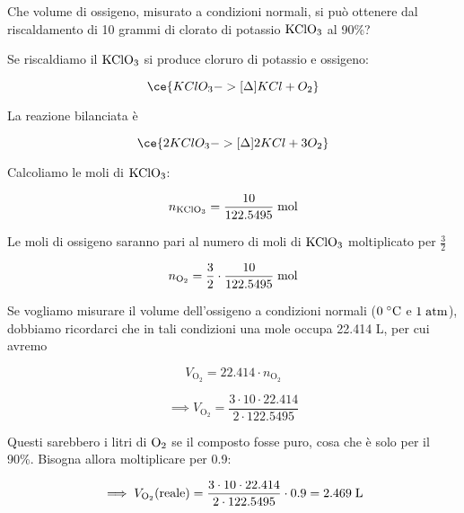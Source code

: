 \begin{esercizio}[$\bigstar$]
    Che volume di ossigeno, misurato a condizioni normali, si può ottenere dal riscaldamento di 10 grammi di clorato di potassio $\rm KClO_3$ al 90\%?
\end{esercizio}
\begin{soluzione}
    Se riscaldiamo il $\rm KClO_3$ si produce cloruro di potassio e ossigeno:

$$\ce{KClO_3 ->[{\Delta}] KCl + O_2}$$

La reazione bilanciata è

$$\ce{2KClO_3 ->[{\Delta}] 2KCl + 3O_2}$$

Calcoliamo le moli di $\rm KClO_3$:

$$n_{\text{KClO}_3}=\frac{10}{122.5495} \; \rm mol$$

Le moli di ossigeno saranno pari al numero di moli di $\rm KClO_3$ moltiplicato per $\frac{3}{2}$

$$n_{\text{O}_2}=\frac{3}{2}\cdot\frac{10}{122.5495} \; \rm mol$$

Se vogliamo misurare il volume dell'ossigeno a condizioni normali ($0 \;^{\circ}\rm C$ e $1 \; \rm atm$), dobbiamo ricordarci che in tali condizioni una mole occupa 22.414 L, per cui avremo

$$V_{\text{O}_2}=22.414 \cdot n_{\text{O}_2}$$

$$\implies V_{\text{O}_2}=\frac{3 \cdot 10 \cdot 22.414}{2 \cdot 122.5495}$$

Questi sarebbero i litri di $\rm O_2$ se il composto fosse puro, cosa che è solo per il 90\%. Bisogna allora moltiplicare per 0.9:

$$\implies V_{\text{O}_2}(\text{reale})
=\frac{3 \cdot 10 \cdot 22.414}{2 \cdot 122.5495}\cdot 0.9=2.469 \; \rm L$$
\end{soluzione}

\newpage

